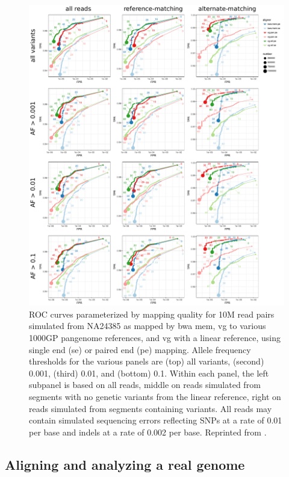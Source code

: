 \begin{figure}[htbp!] 
\centering    
\includegraphics[width=1.0\textwidth]{Chapter3/Figs/human-10M-results-7358a67_merge_panel_labeled.pdf}
\caption[Simulated reads from HG002 versus various human pangenome graphs.]{
  ROC curves parameterized by mapping quality for 10M read pairs simulated from NA24385 as mapped by bwa mem, vg to various 1000GP pangenome references, and vg with a linear reference, using single end (se) or paired end (pe) mapping.
  Allele frequency thresholds for the various panels are (top) all variants, (second) 0.001, (third) 0.01, and (bottom) 0.1.
  Within each panel, the left subpanel is based on all reads, middle on reads simulated from segments with no genetic variants from the linear reference, right on reads simulated from segments containing variants.
  All reads may contain simulated sequencing errors reflecting SNPs at a rate of 0.01 per base and indels at a rate of 0.002 per base.
  Reprinted from \cite{garrison2018variation}.}
\label{fig:HG002_1000GP_sim}
\end{figure}

\subsection{Aligning and analyzing a real genome}

